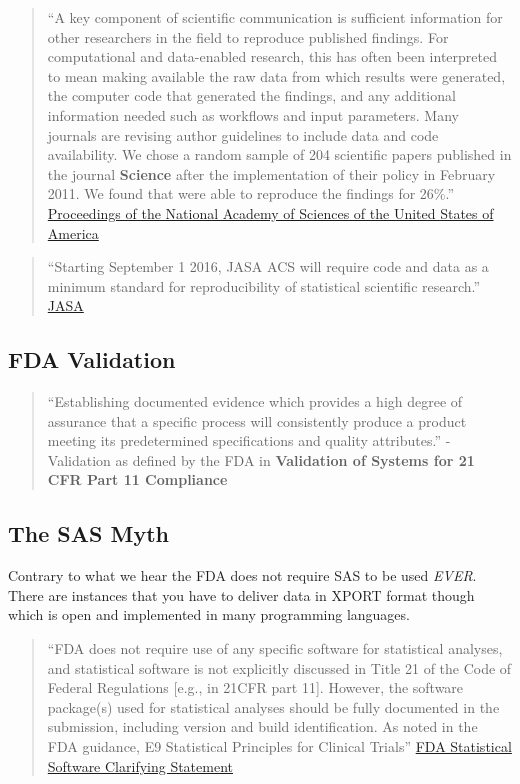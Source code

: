 \documentclass[]{book}
\begin{document}
\begin{quote}
``A key component of scientific communication is sufficient information
for other researchers in the field to reproduce published findings. For
computational and data-enabled research, this has often been interpreted
to mean making available the raw data from which results were generated,
the computer code that generated the findings, and any additional
information needed such as workflows and input parameters. Many journals
are revising author guidelines to include data and code availability. We
chose a random sample of 204 scientific papers published in the journal
\textbf{Science} after the implementation of their policy in February
2011. We found that were able to reproduce the findings for 26\%.''
\href{http://www.pnas.org/content/115/11/2584}{Proceedings of the
National Academy of Sciences of the United States of America}
\end{quote}

\begin{quote}
``Starting September 1 2016, JASA ACS will require code and data as a
minimum standard for reproducibility of statistical scientific
research.''
\href{https://magazine.amstat.org/blog/2016/07/01/jasa-reproducible16/}{JASA}
\end{quote}

\subsection{FDA Validation}\label{fda-validation}

\begin{quote}
``Establishing documented evidence which provides a high degree of
assurance that a specific process will consistently produce a product
meeting its predetermined specifications and quality attributes.''
-Validation as defined by the FDA in \textbf{Validation of Systems for
21 CFR Part 11 Compliance}
\end{quote}

\subsection{The SAS Myth}\label{the-sas-myth}

Contrary to what we hear the FDA does not require SAS to be used
\emph{EVER}. There are instances that you have to deliver data in XPORT
format though which is open and implemented in many programming
languages.

\begin{quote}
``FDA does not require use of any specific software for statistical
analyses, and statistical software is not explicitly discussed in Title
21 of the Code of Federal Regulations {[}e.g., in 21CFR part 11{]}.
However, the software package(s) used for statistical analyses should be
fully documented in the submission, including version and build
identification. As noted in the FDA guidance, E9 Statistical Principles
for Clinical Trials''
\href{https://www.fda.gov/downloads/forindustry/datastandards/studydatastandards/ucm587506.pdf}{FDA
Statistical Software Clarifying Statement}
\end{quote}
\end{document}
